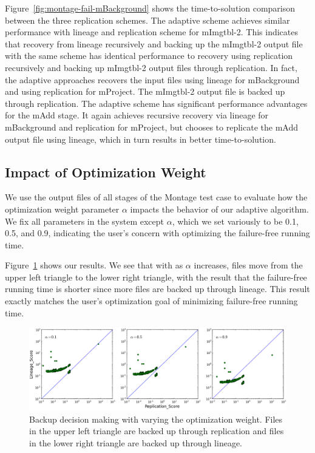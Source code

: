 \documentclass{sig-alternate}
\begin{document}
Figure~\ref{fig:montage-fail-mBackground} shows the time-to-solution comparison between the three replication schemes. 
The adaptive scheme achieves similar performance with lineage and replication scheme for mImgtbl-2. 
This indicates that recovery from lineage recursively and backing up the mImgtbl-2 output file with the same scheme has identical performance to recovery using replication recursively and backing up mImgtbl-2 output files through replication. 
In fact, the adaptive approaches recovers the input files using lineage for mBackground and using replication for mProject. The mImgtbl-2 output file is backed up through replication.
The adaptive scheme has significant performance advantages for the mAdd stage.
It again achieves recursive recovery via lineage for mBackground and replication for mProject,
but chooses to replicate the mAdd output file using lineage, which in turn results in better time-to-solution.



\subsection{Impact of Optimization Weight}
\label{sec:Perf:Weight}
We use the output files of all stages of the Montage test case to evaluate how the optimization weight parameter $\alpha$ impacts the behavior of our adaptive algorithm.
We fix all parameters in the system except $\alpha$, which we set variously to be 0.1, 0.5, and 0.9, indicating the user's concern with optimizing the failure-free running time.


Figure~\ref{fig:weight} shows our results. We see that with as $\alpha$ increases, files move from the upper left triangle to the lower right triangle, with the result that the failure-free running time is shorter since more files are backed up through lineage.
This result exactly matches the user's optimization goal of minimizing failure-free running time.

\begin{figure}[ht]
	\begin{center}
		\includegraphics[width=160mm]{pictures/weight}
		\vspace{-10pt}
		\caption{Backup decision making with varying the optimization weight. Files in the upper left triangle are backed up through replication and files in the lower right triangle are backed up through lineage.
		\label{fig:weight}}
  	\end{center}
\end{figure}
\end{document}
